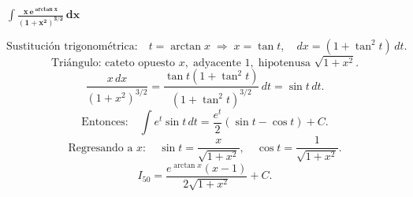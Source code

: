 $\displaystyle \mathbf{\int \frac{x\,e^{\arctan x}}{(1+x^{2})^{3/2}}\,dx}$

\nopagebreak
$$
\text{Sustitución trigonométrica:}\quad
t = \arctan x \;\Rightarrow\; x = \tan t,\quad dx = (1+\tan^{2}t)\,dt.
$$
$$
\text{Triángulo: cateto opuesto } x,\; \text{adyacente } 1,\; \text{hipotenusa } \sqrt{1+x^{2}}.
$$
$$
\frac{x\,dx}{(1+x^{2})^{3/2}}
= \frac{\tan t(1+\tan^{2}t)}{(1+\tan^{2}t)^{3/2}}\,dt
= \sin t\,dt.
$$
$$
\text{Entonces:}\quad
\int e^{t}\sin t\,dt
= \frac{e^{t}}{2}(\sin t - \cos t) + C.
$$
$$
\text{Regresando a } x:\quad
\sin t = \frac{x}{\sqrt{1+x^{2}}}, \quad
\cos t = \frac{1}{\sqrt{1+x^{2}}}.
$$
$$
\boxed{
I_{50} =
\frac{e^{\arctan x}(x-1)}{2\sqrt{1+x^{2}}} + C.
}
$$

